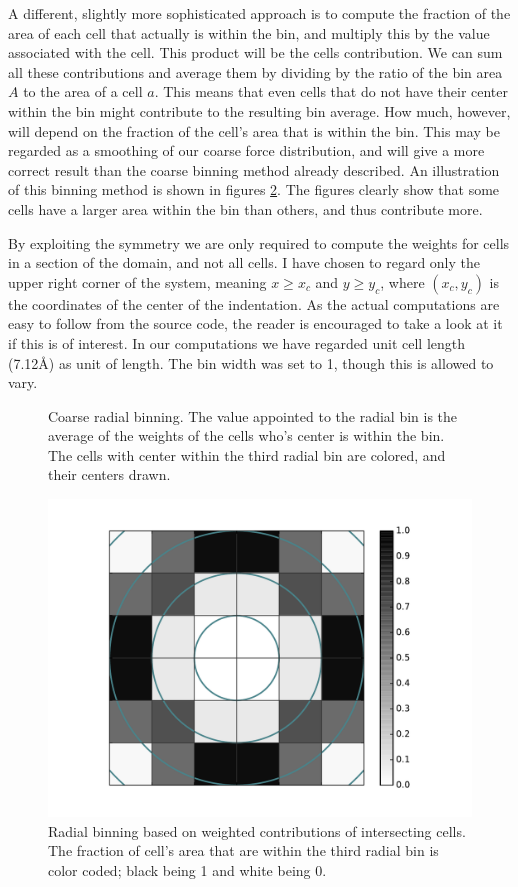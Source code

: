 \documentclass[twoside,english]{uiofysmaster}
\begin{document}
A different, slightly more sophisticated approach is to compute the fraction of the area of each cell that actually is within the bin, and multiply this by the value associated with the cell. This product will be the cells contribution.
We can sum all these contributions and average them by dividing by the ratio of the bin area $A$ to the area of a cell $a$.  
This means that even cells that do not have their center within the bin might contribute to the resulting bin average. 
How much, however, will depend on the fraction of the cell's area that is within the bin.
This may be regarded as a smoothing of our coarse force distribution, and will give a more correct result than the coarse binning method already described. 
An illustration of this binning method is shown in figures \ref{fig:radialBinningWeights}.
The figures clearly show that some cells have a larger area within the bin than others, and thus contribute more. 


By exploiting the symmetry we are only required to compute the weights for cells in a section of the domain, and not all cells. 
I have chosen to regard only the upper right corner of the system, meaning $x\geq x_c$ and $y\geq y_c$, where $(x_c, y_c)$ is the coordinates of the center of the indentation.
As the actual computations are easy to follow from the source code, the reader is encouraged to take a look at it if this is of interest. 
In our computations we have regarded unit cell length (7.12\AA) as unit of length.
The bin width was set to 1, though this is allowed to vary. 


\begin{figure}[H]
	\center
	\resizebox{0.4\linewidth}{!}{
		
	}
	\caption{Coarse radial binning. The value appointed to the radial bin is the average of the weights of the cells who's center is within the bin. The cells with center within the third radial bin are colored, and their centers drawn.}
	\label{fig:radialBinningChoars}
\end{figure}


\begin{figure}[H]
	\centering
	\hspace{0.74cm}
	\includegraphics[height=0.39\linewidth]{figures/forceDistribution/radialDistribution/weights.pdf}
	\caption{Radial binning based on weighted contributions of intersecting cells. The fraction of cell's area that are within the third radial bin is color coded; black being 1 and white being 0.}
	\label{fig:radialBinningWeights}
\end{figure}
\end{document}

